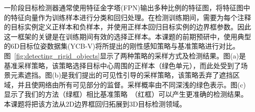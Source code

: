 \documentclass[12pt]{article}
\begin{document}




一阶段目标检测器通常使用特征金字塔(FPN)输出多种比例的特征图，将特征图中的特征向量作为训练样本进行分类和回归处理。在检测训练期间，需要为每个注释的目标实例定义正样本和负样本，并使用正样本回归目标实例的边界框参数。因此这一框架的关键是在训练期间有效的选择正样本。本课题的前期预研中，使用典型的6D目标位姿数据集(YCB-V)将所提出的刚性感知策略与基准策略进行对比。图~\ref{fig:detecting_rigid_objects}显示了两种策略的采样方式及检测结果。图(a)是基准采样策略，该策略选择目标中心周围的正样本（绿色单元），而此处受到了场景元素遮挡。图(b)是我们提出的可见性引导的采样策略，该策略丢弃了遮挡区域，并且使网络由所有可见部分的监督。采样概率由不同深浅的绿色表示。图(c)显示了我们的方法（绿框）相比基准策略~\cite{Zhang2020}（红框）可以产生更准确的检测结果。本课题将把该方法从2D边界框回归拓展到3D目标检测领域。
\end{document}

